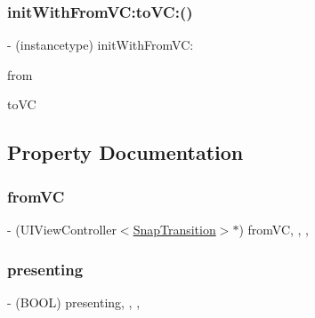 \subsubsection{\texorpdfstring{init\+With\+From\+V\+C\+:to\+V\+C\+:()}{initWithFromVC:toVC:()}}
{\footnotesize\ttfamily -\/ (instancetype) init\+With\+From\+V\+C\+: \begin{DoxyParamCaption}\item[{(U\+I\+View\+Controller$<$ \hyperlink{protocol_snap_transition-p}{Snap\+Transition} $>$ $\ast$)}]{from }\item[{toVC:(U\+I\+View\+Controller$<$ \hyperlink{protocol_snap_transition-p}{Snap\+Transition} $>$ $\ast$)}]{to\+VC }\end{DoxyParamCaption}}



\subsection{Property Documentation}
\hypertarget{interface_snap_transition_animator_a0f91c695757a22bc4f29f58e96a300bd}{}\label{interface_snap_transition_animator_a0f91c695757a22bc4f29f58e96a300bd} 
\subsubsection{\texorpdfstring{from\+VC}{fromVC}}
{\footnotesize\ttfamily -\/ (U\+I\+View\+Controller$<$\hyperlink{protocol_snap_transition-p}{Snap\+Transition}$>$$\ast$) from\+VC\hspace{0.3cm}{\ttfamily [read]}, {\ttfamily [write]}, {\ttfamily [nonatomic]}, {\ttfamily [weak]}}

\hypertarget{interface_snap_transition_animator_a326b257087c19213336c4a30faade718}{}\label{interface_snap_transition_animator_a326b257087c19213336c4a30faade718} 
\subsubsection{\texorpdfstring{presenting}{presenting}}
{\footnotesize\ttfamily -\/ (B\+O\+OL) presenting\hspace{0.3cm}{\ttfamily [read]}, {\ttfamily [write]}, {\ttfamily [nonatomic]}, {\ttfamily [assign]}}

